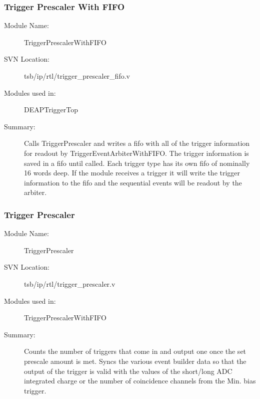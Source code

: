 		\subsubsection{Trigger Prescaler With FIFO}
		\label{sec:trigPrescaleFifo}
		\begin{description}
		\item[Module Name:] TriggerPrescalerWithFIFO
		\item[SVN Location:]  tsb/ip/rtl/trigger\_prescaler\_fifo.v
		\item[Modules used in:] DEAPTriggerTop
		\item[Summary:] Calls TriggerPrescaler and writes a \gls{fifo} with all of the trigger information for readout by TriggerEventArbiterWithFIFO. The trigger information is saved in a \gls{fifo} until called. Each trigger type has its own \gls{fifo} of nominally 16 words deep. If the module receives a trigger it will write the trigger information to the \gls{fifo} and the sequential events will be readout by the arbiter.
		\end{description}
		
		
		\subsubsection{Trigger Prescaler}
		\label{sec:trigPrescaler}
		\begin{description}
		\item[Module Name:] TriggerPrescaler
		\item[SVN Location:]  tsb/ip/rtl/trigger\_prescaler.v
		\item[Modules used in:] TriggerPrescalerWithFIFO
		\item[Summary:] Counts the number of triggers that come in and output one once the set prescale amount is met. Syncs the various event builder data so that the output of the trigger is valid with the values of the short/long ADC integrated charge or the number of coincidence channels from the Min. bias trigger. 
		\end{description}
	

